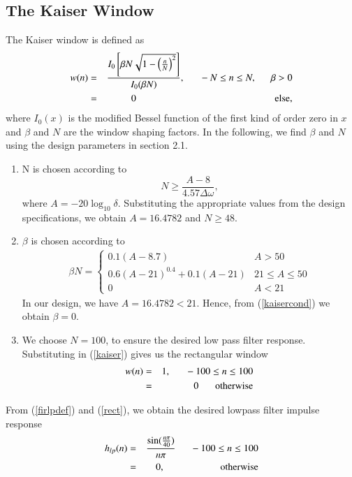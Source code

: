 \documentclass[journal,12pt,twocolumn]{IEEEtran}
\begin{document}
\subsection{The Kaiser Window}
The Kaiser window is defined as
\begin{eqnarray}
\label{kaiser}
w(n) &=& \frac{I_0\left[ \beta N \sqrt{1 - \left(\frac{n}{N}\right)^2} \right]}{I_0(\beta N)},
\indent -N \leq n \leq N, \indent \beta > 0 \nonumber \\
&=& 0 \hspace{5cm} \mbox{else,}
\end{eqnarray}
where $I_0(x)$ is the modified Bessel function of the first kind of order zero in $x$ and $\beta$
and $N$ are the window shaping factors.  In the following,
we find $\beta$ and $N$ using the design parameters in section 2.1.
\begin{enumerate}
\item  N is chosen according to
\begin{equation}
N \geq \frac{A-8}{4.57\Delta \omega},
\end{equation}
where $A = -20\log_{10}\delta$.  Substituting the appropriate values from the design specifications, we obtain
$A = 16.4782$ and $N \geq 48$.
\item  $\beta$ is chosen according to
\begin{eqnarray}
\label{kaisercond}
\beta N = \left\{ \begin{array}{ll} 0.1(A-8.7) & A > 50 \\
0.6(A-21)^{0.4}+ 0.1(A-21) & 21 \leq A \leq 50 \\
0 & A < 21\end{array} \right.
\end{eqnarray}
In our design, we have $A = 16.4782 < 21$.  Hence, from (\ref{kaisercond}) we obtain $\beta = 0$.  
\item We choose $N = 100$, to ensure the desired low pass filter response.  Substituting in (\ref{kaiser})
gives us the rectangular window
\begin{eqnarray}
\label{rect}
w(n) &=& 1, \indent -100 \leq n \leq 100 \nonumber \\
&=& 0 \hspace{6mm} \mbox{otherwise}
\end{eqnarray}
\end{enumerate}
From (\ref{firlpdef}) and (\ref{rect}), we obtain the desired lowpass filter impulse response
\begin{eqnarray}
\label{firlpfinal}
h_{lp}(n) &=& \frac{\sin(\frac{n\pi}{40})}{n\pi} \indent -100 \leq n \leq 100 \nonumber \\
&=& 0, \hspace{2cm} \mbox{otherwise}
\end{eqnarray}
\end{document}

